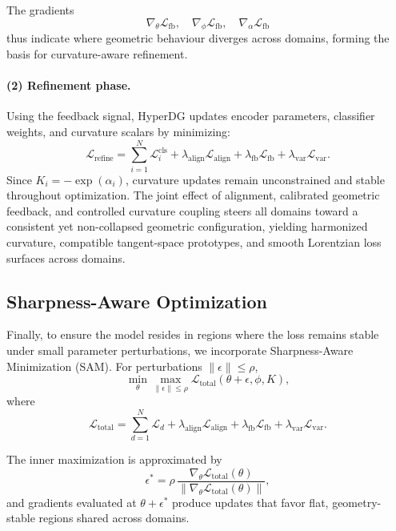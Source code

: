 \documentclass[10pt]{article} %
\begin{document}
The gradients
\[
\nabla_{\theta}\mathcal{L}_{\mathrm{fb}},\quad
\nabla_{\phi}\mathcal{L}_{\mathrm{fb}},\quad
\nabla_{\alpha}\mathcal{L}_{\mathrm{fb}}
\]
thus indicate where geometric behaviour diverges across domains, forming the
basis for curvature-aware refinement.

\paragraph{(2) Refinement phase.}
Using the feedback signal, HyperDG updates encoder parameters, classifier
weights, and curvature scalars by minimizing:
\[
\mathcal{L}_{\mathrm{refine}}
=
\sum_{i=1}^{N}\mathcal{L}_{i}^{\mathrm{cls}}
+
\lambda_{\mathrm{align}}\mathcal{L}_{\mathrm{align}}
+
\lambda_{\mathrm{fb}}\mathcal{L}_{\mathrm{fb}}
+
\lambda_{\mathrm{var}}\mathcal{L}_{\mathrm{var}}.
\]
Since $K_i=-\exp(\alpha_i)$, curvature updates remain unconstrained and stable
throughout optimization. The joint effect of alignment, calibrated geometric
feedback, and controlled curvature coupling steers all domains toward a
consistent yet non-collapsed geometric configuration, yielding harmonized
curvature, compatible tangent-space prototypes, and smooth Lorentzian loss
surfaces across domains.




\subsection{Sharpness-Aware Optimization}
\label{sec:sam}

Finally, to ensure the model resides in regions where the loss remains stable
under small parameter perturbations, we incorporate Sharpness-Aware
Minimization (SAM). For perturbations $\|\epsilon\|\le\rho$,
\begin{equation}
\min_{\theta}
\max_{\|\epsilon\|\le\rho}
\mathcal{L}_{\mathrm{total}}(\theta+\epsilon,\phi,K),
\label{eq:sam-minmax}
\end{equation}
where
\[
\mathcal{L}_{\mathrm{total}}
=
\sum_{d=1}^{N}\mathcal{L}_{d}
+
\lambda_{\mathrm{align}}\mathcal{L}_{\mathrm{align}}
+
\lambda_{\mathrm{fb}}\mathcal{L}_{\mathrm{fb}}
+
\lambda_{\mathrm{var}}\mathcal{L}_{\mathrm{var}}.
\]

The inner maximization is approximated by
\[
\epsilon^{*}
=
\rho\,
\frac{
\nabla_{\theta}\mathcal{L}_{\mathrm{total}}(\theta)
}{
\|\nabla_{\theta}\mathcal{L}_{\mathrm{total}}(\theta)\|
},
\]
and gradients evaluated at $\theta+\epsilon^{*}$ produce updates that favor
flat, geometry-stable regions shared across domains.
\end{document}

